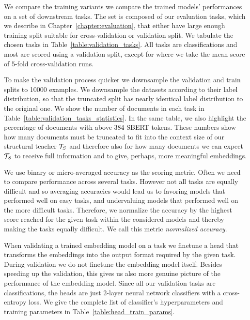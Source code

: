 We compare the training variants we compare the trained models' performances on
a set of downstream tasks. The set is composed of our evaluation tasks, which we
describe in Chapter~\ref{chapter:evaluation}, that either have large enough
training split suitable for cross-validation or validation split. We tabulate
the chosen tasks in Table~\ref{table:validation_tasks}. All tasks are
classifications and most are scored using a validation split, except for
 where we take the mean score of 5-fold cross-validation runs.

To make the validation process quicker we downsample the validation and train
splits to 10000 examples. We downsample the datasets according to their label
distribution, so that the truncated split has nearly identical label
distribution to the original one. We show the number of documents in each task
in Table~\ref{table:validation_tasks_statistics}. In the same table, we also
highlight the percentage of documents with above 384 SBERT tokens. These numbers
show how many documents must be truncated to fit into the context size of our
structural teacher $\mathcal{T}_S$ and therefore also for how many documents we can
expect $\mathcal{T}_S$ to receive full information and to give, perhaps, more
meaningful embeddings.

We use binary or micro-averaged accuracy as the scoring metric. Often we need to
compare performance across several tasks. However not all tasks are equally
difficult and so averaging accuracies would lead us to favoring models that
performed well on easy tasks, and undervaluing models that performed well on the
more difficult tasks. Therefore, we normalize the accuracy by the highest score
reached for the given task within the considered models and thereby making the
tasks equally difficult. We call this metric \emph{normalized accuracy}.

When validating a trained embedding model on a task we finetune a head that
transforms the embeddings into the output format required by the given task.
During validation we do not finetune the embedding model itself. Besides
speeding up the validation, this gives us also more genuine picture of the
performance of the embedding model. Since all our validation tasks are
classifications, the heads are just 2-layer neural network classifiers with a
cross-entropy loss. We give the complete list of classifier's hyperparameters
and training parameters in Table~\ref{table:head_train_params}.

